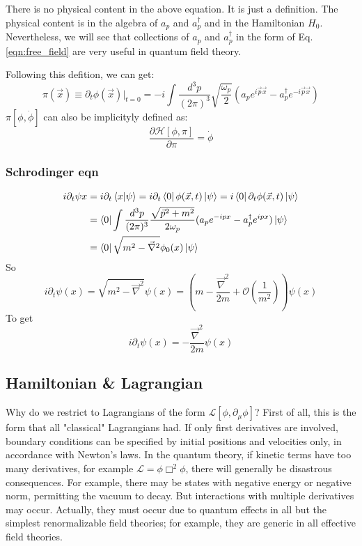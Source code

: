 There is no physical content in the above equation. It is just a definition.
The physical content is in the algebra of $a_p$ and $a_p^{\dag}$ and in the
Hamiltonian $H_0$. Nevertheless, we will see that collections of $a_p$ and
$a_p^{\dag}$ in the form of Eq.\ref{eqn:free_field} are very useful in
quantum field theory.

Following this defition, we can get:
\[ \pi(\vec{x}) \equiv \partial_t \phi(\vec{x})|_{t=0} = 
-i \int \frac{d^{3}p}{(2\pi)^3} \sqrt{\frac{\omega_p}{2}}(a_pe^{i\vec{p}\vec{x}} - a_p^\dag e^{-i\vec{p}\vec{x}}) \]
$\pi[\phi, \dot{\phi}]$ can also be implicityly defined as:
\[ \frac{\partial \mathcal{H}[\phi, \pi ]}{\partial \pi } = \dot{\phi}\]

\subsubsection{Schrodinger eqn}
\[
    \begin{aligned}
	i\partial_t\psi{x}&=i\partial_t\bra{x}\ket{\psi}=i\partial_t\bra{0}\phi(\vec{x},t)\ket{\psi}=i\bra{0}\partial_t\phi(\vec{x},t)\ket{\psi}\\
	&=\bra{0}\int\frac{d^3p}{(2\pi)^3}\frac{\sqrt{\vec{p}^2+m^2}}{2\omega_p}(a_pe^{-ipx}-a^\dag_pe^{ipx})\ket{\psi}\\
	&=\bra{0}\sqrt{m^2-\vec{\nabla}^2}\phi_0(x)\ket{\psi}\\
    \end{aligned}
    \]
So
\[
    i\partial_t\psi(x)=\sqrt{m^2-\vec{\nabla}^2}\psi(x)=\left(m-\frac{\vec{\nabla}^2}{2m}+\mathcal{O}(\frac{1}{m^2})\right)\psi(x)
    \]
To get
\[
    i\partial_t\psi(x)=-\frac{\vec{\nabla}^2}{2m}\psi(x)
    \]
\subsection{Hamiltonian \& Lagrangian}
Why do we restrict to Lagrangians of the form $\mathcal{L}[\phi,
\partial_\mu \phi]$? First of all, this is the form that all "classical" 
Lagrangians had. If only first derivatives are involved, boundary 
conditions can be specified by initial positions and velocities only, in
accordance with Newton's laws. In the quantum theory, if kinetic terms 
have too many derivatives, for example $\mathcal{L} = \phi\Box^2\phi$, 
there will generally be disastrous consequences. For example, there may be
states with negative energy or negative norm, permitting the vacuum to decay. 
But interactions with multiple derivatives may occur. Actually, they must
occur due to quantum effects in all but the simplest renormalizable field
theories; for example, they are generic in all effective field theories.

